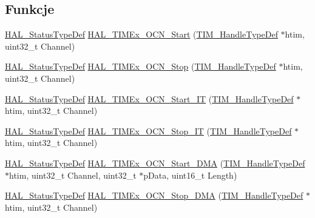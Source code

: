 \subsection*{Funkcje}
\begin{DoxyCompactItemize}
\item 
\hyperlink{stm32f4xx__hal__def_8h_a63c0679d1cb8b8c684fbb0632743478f}{H\+A\+L\+\_\+\+Status\+Type\+Def} \hyperlink{group___t_i_m_ex___exported___functions___group2_ga56d25f544564ef28a66dca7ec150de00}{H\+A\+L\+\_\+\+T\+I\+M\+Ex\+\_\+\+O\+C\+N\+\_\+\+Start} (\hyperlink{struct_t_i_m___handle_type_def}{T\+I\+M\+\_\+\+Handle\+Type\+Def} $\ast$htim, uint32\+\_\+t Channel)
\item 
\hyperlink{stm32f4xx__hal__def_8h_a63c0679d1cb8b8c684fbb0632743478f}{H\+A\+L\+\_\+\+Status\+Type\+Def} \hyperlink{group___t_i_m_ex___exported___functions___group2_ga576cb1c3e40fc49555f232773cb2cdbc}{H\+A\+L\+\_\+\+T\+I\+M\+Ex\+\_\+\+O\+C\+N\+\_\+\+Stop} (\hyperlink{struct_t_i_m___handle_type_def}{T\+I\+M\+\_\+\+Handle\+Type\+Def} $\ast$htim, uint32\+\_\+t Channel)
\item 
\hyperlink{stm32f4xx__hal__def_8h_a63c0679d1cb8b8c684fbb0632743478f}{H\+A\+L\+\_\+\+Status\+Type\+Def} \hyperlink{group___t_i_m_ex___exported___functions___group2_ga2f4d7c285095d5293b81d2e11cd991af}{H\+A\+L\+\_\+\+T\+I\+M\+Ex\+\_\+\+O\+C\+N\+\_\+\+Start\+\_\+\+IT} (\hyperlink{struct_t_i_m___handle_type_def}{T\+I\+M\+\_\+\+Handle\+Type\+Def} $\ast$htim, uint32\+\_\+t Channel)
\item 
\hyperlink{stm32f4xx__hal__def_8h_a63c0679d1cb8b8c684fbb0632743478f}{H\+A\+L\+\_\+\+Status\+Type\+Def} \hyperlink{group___t_i_m_ex___exported___functions___group2_gabe91877781dbd7fb9fdd63262e6ea10f}{H\+A\+L\+\_\+\+T\+I\+M\+Ex\+\_\+\+O\+C\+N\+\_\+\+Stop\+\_\+\+IT} (\hyperlink{struct_t_i_m___handle_type_def}{T\+I\+M\+\_\+\+Handle\+Type\+Def} $\ast$htim, uint32\+\_\+t Channel)
\item 
\hyperlink{stm32f4xx__hal__def_8h_a63c0679d1cb8b8c684fbb0632743478f}{H\+A\+L\+\_\+\+Status\+Type\+Def} \hyperlink{group___t_i_m_ex___exported___functions___group2_gacf9eba45624d72a463fd0f950cf72964}{H\+A\+L\+\_\+\+T\+I\+M\+Ex\+\_\+\+O\+C\+N\+\_\+\+Start\+\_\+\+D\+MA} (\hyperlink{struct_t_i_m___handle_type_def}{T\+I\+M\+\_\+\+Handle\+Type\+Def} $\ast$htim, uint32\+\_\+t Channel, uint32\+\_\+t $\ast$p\+Data, uint16\+\_\+t Length)
\item 
\hyperlink{stm32f4xx__hal__def_8h_a63c0679d1cb8b8c684fbb0632743478f}{H\+A\+L\+\_\+\+Status\+Type\+Def} \hyperlink{group___t_i_m_ex___exported___functions___group2_ga09216649456d28828492740232b275fd}{H\+A\+L\+\_\+\+T\+I\+M\+Ex\+\_\+\+O\+C\+N\+\_\+\+Stop\+\_\+\+D\+MA} (\hyperlink{struct_t_i_m___handle_type_def}{T\+I\+M\+\_\+\+Handle\+Type\+Def} $\ast$htim, uint32\+\_\+t Channel)
\end{DoxyCompactItemize}


